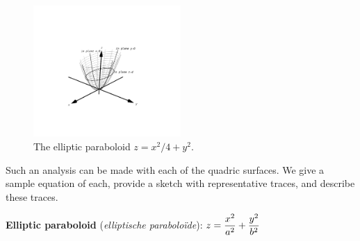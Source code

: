 \begin{figure}[h!]
	\begin{center}
			\includegraphics[width=0.5\textwidth]{fig_ana_geo_16}
	\caption{The elliptic paraboloid $z=x^2/4+y^2$.}
	\label{fig_ana_geo_16}
	\end{center}
\end{figure}

Such an analysis can be made with each of the quadric surfaces. We give a sample equation of each, provide a sketch with representative traces, and describe these traces.

\ifcalculus\pagebreak\fi
\textbf{Elliptic paraboloid} (\textit{elliptische parabolo\"ide}): \quad$\displaystyle z=\frac{x^2}{a^2}+\frac{y^2}{b^2}$\\



